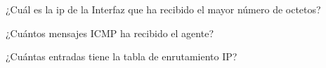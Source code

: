 \item ¿Cuál es la ip de la Interfaz que ha recibido el mayor número de octetos?
\item ¿Cuántos mensajes ICMP ha recibido el agente?
\item ¿Cuántas entradas tiene la tabla de enrutamiento IP?

